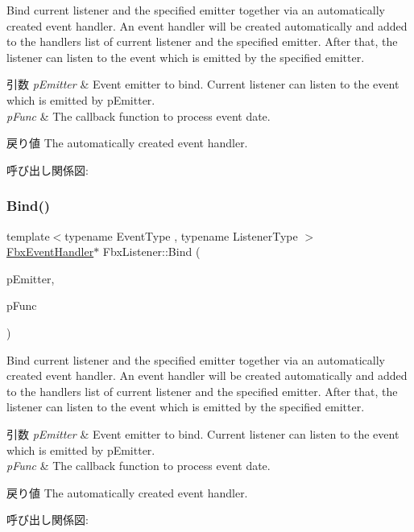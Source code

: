 Bind current listener and the specified emitter together via an automatically created event handler. An event handler will be created automatically and added to the handlers list of current listener and the specified emitter. After that, the listener can listen to the event which is emitted by the specified emitter. 
\begin{DoxyParams}{引数}
{\em p\+Emitter} & Event emitter to bind. Current listener can listen to the event which is emitted by p\+Emitter. \\
\hline
{\em p\+Func} & The callback function to process event date. \\
\hline
\end{DoxyParams}
\begin{DoxyReturn}{戻り値}
The automatically created event handler. 
\end{DoxyReturn}
呼び出し関係図\+:
\mbox{\label{class_fbx_listener_a2c3413cf0a62389613102a6ed9727ed1}} 
\subsubsection{\texorpdfstring{Bind()}{Bind()}\hspace{0.1cm}{\footnotesize\ttfamily [2/3]}}
{\footnotesize\ttfamily template$<$typename Event\+Type , typename Listener\+Type $>$ \\
\hyperlink{class_fbx_event_handler}{Fbx\+Event\+Handler}$\ast$ Fbx\+Listener\+::\+Bind (\begin{DoxyParamCaption}\item[{\hyperlink{class_fbx_emitter}{Fbx\+Emitter} \&}]{p\+Emitter,  }\item[{void(Listener\+Type\+::$\ast$)(const Event\+Type $\ast$) const}]{p\+Func }\end{DoxyParamCaption})}

Bind current listener and the specified emitter together via an automatically created event handler. An event handler will be created automatically and added to the handlers list of current listener and the specified emitter. After that, the listener can listen to the event which is emitted by the specified emitter. 
\begin{DoxyParams}{引数}
{\em p\+Emitter} & Event emitter to bind. Current listener can listen to the event which is emitted by p\+Emitter. \\
\hline
{\em p\+Func} & The callback function to process event date. \\
\hline
\end{DoxyParams}
\begin{DoxyReturn}{戻り値}
The automatically created event handler. 
\end{DoxyReturn}
呼び出し関係図\+:
\mbox{\label{class_fbx_listener_aeb47fdd2b68d0d626e3b59ee2da20255}} 
